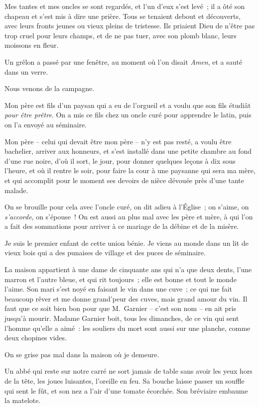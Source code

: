 \documentclass[french,twoside]{book} %
\begin{document}
Mes tantes et mes oncles se sont regardés, et l’un d’eux s’est levé ; il a ôté son chapeau et s’est mis à dire une prière. Tous se tenaient debout et découverts, avec leurs fronts jeunes ou vieux pleins de tristesse. Ils priaient Dieu de n’être pas trop cruel pour leurs champs, et de ne pas tuer, avec son plomb blanc, leurs moissons en fleur.\par
Un grêlon a passé par une fenêtre, au moment où l’on disait \emph{Amen}, et a sauté dans un verre.\par
\bigbreak
\noindent Nous venons de la campagne.\par
Mon père est fils d’un paysan qui a eu de l’orgueil et a voulu que son fils étudiât \emph{pour être prêtre}. On a mis ce fils chez un oncle curé pour apprendre le latin, puis on l’a envoyé au séminaire.\par
Mon père – celui qui devait être mon père – n’y est pas resté, a voulu être bachelier, arriver aux honneurs, et s’est installé dans une petite chambre au fond d’une rue noire, d’où il sort, le jour, pour donner quelques leçons à dix sous l’heure, et où il rentre le soir, pour faire la cour à une paysanne qui sera ma mère, et qui accomplit pour le moment ses devoirs de nièce dévouée près d’une tante malade.\par
On se brouille pour cela avec l’oncle curé, on dit adieu à l’Église ; on s’aime, on \emph{s’accorde}, on s’épouse ! On est aussi au plus mal avec les père et mère, à qui l’on a fait des sommations pour arriver à ce mariage de la débine et de la misère.\par
Je suis le premier enfant de cette union bénie. Je viens au monde dans un lit de vieux bois qui a des punaises de village et des puces de séminaire.\par
\bigbreak
\noindent La maison appartient à une dame de cinquante ans qui n’a que deux dents, l’une marron et l’autre bleue, et qui rit toujours ; elle est bonne et tout le monde l’aime. Son mari s’est noyé en faisant le vin dans une cuve ; ce qui me fait beaucoup rêver et me donne grand’peur des cuves, mais grand amour du vin. Il faut que ce soit bien bon pour que M. Garnier – c’est son nom – en ait pris jusqu’à mourir. Madame Garnier boit, tous les dimanches, de ce vin qui sent l’homme qu’elle a aimé : les souliers du mort sont aussi sur une planche, comme deux chopines vides.\par
On se grise pas mal dans la maison où je demeure.\par
Un abbé qui reste sur notre carré ne sort jamais de table sans avoir les yeux hors de la tête, les joues luisantes, l’oreille en feu. Sa bouche laisse passer un souffle qui sent le fût, et son nez a l’air d’une tomate écorchée. Son bréviaire embaume la matelote.\par
\end{document}
